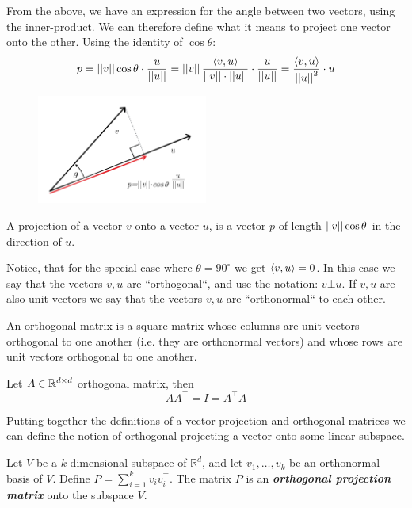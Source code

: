 From the above, we have an expression for the angle between two vectors, using the inner-product. We can therefore define what it means to project one vector onto the other. Using the identity of $\cos\theta$: $$p=\left|\left| v\right|\right|\cos\theta\cdot \frac{u}{\left|\left| u\right|\right|}=\left|\left| v\right|\right|\frac{ \left\langle v,u\right\rangle}{\left|\left| v\right|\right|\cdot\left|\left| u\right|\right|}\cdot \frac{u}{\left|\left| u\right|\right|}=\frac{ \left\langle v,u\right\rangle }{\left|\left| u\right|\right|^2}\cdot u$$
\begin{figure}[H]
	\centering
	\includegraphics[width=0.5\textwidth]{chapters/mathematical.basis/figures/1_2.png}  
\end{figure}

\begin{definition}
A projection of a vector $v$ onto a vector $u$, is a vector $p$ of length $\left|\left| v\right|\right| \cos \theta$ in the direction of $u$.
\end{definition}


Notice, that for the special case where $\theta=90^{\circ}$ we get $\left\langle v,u\right\rangle=0$. In this case we say that the vectors $v,u$ are ``orthogonal``, and use the notation: $v\bot u$. If $v,u$ are also unit vectors we say that the vectors $v,u$ are ``orthonormal`` to each other.



\begin{definition}
An orthogonal matrix is a square matrix whose columns are unit vectors orthogonal to one another (i.e. they are orthonormal vectors) and whose rows are unit vectors orthogonal to one another.
\end{definition}

\begin{lemma}
Let $A\in \mathbb{R}^{d\times d}$ orthogonal matrix, then $$AA^\top=I=A^\top A$$
\end{lemma}

Putting together the definitions of a vector projection and orthogonal matrices we can define the notion of orthogonal projecting a vector onto some linear subspace.

\begin{definition}

Let $V$ be a $k$-dimensional subspace of $\mathbb{R}^{d}$, and let $v_{1},\ldots,v_{k}$ be an orthonormal basis of $V$. Define $P=\sum_{i=1}^{k}v_{i}v_{i}^{\top}$. The matrix $P$ is an \textbf{\emph{orthogonal projection matrix}}
onto the subspace $V$.
\end{definition}

